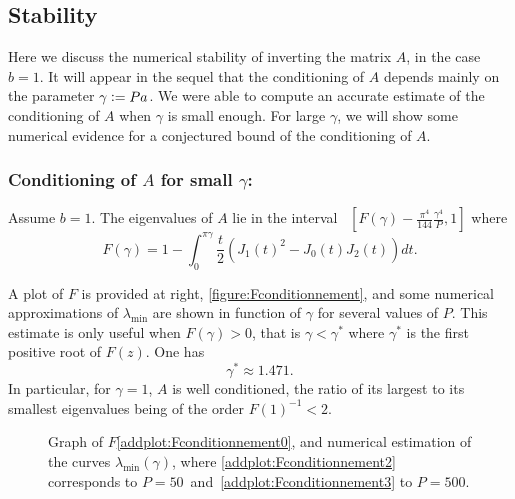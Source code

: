 \documentclass[11pt,a4paper]{article}
\begin{document}
\subsection{Stability}
\newcommand{\Pa}{\gamma}
\newcommand{\Pastar}{\Pa^*}
Here we discuss the numerical stability of inverting the matrix $A$, in the case $b=1$. It will appear in the sequel that the conditioning of $A$ depends mainly on the parameter $\Pa \isdef Pa$. We were able to compute an accurate estimate of the conditioning of $A$ when $\Pa$ is small enough. For large $\Pa$, we will show some numerical evidence for a conjectured bound of the conditioning of $A$.   
\vspace{0.3cm}
\noindent \begin{minipage}{0.5\textwidth}
\subsubsection*{Conditioning of $A$ for small $\Pa$:}
\begin{The} Assume $b=1$. The eigenvalues of $A$ lie in the interval~ ${[F(\Pa) - \frac{\pi^4}{144}\frac{\gamma^4}{P},1]}$ where
	\[F(\Pa) = 1 - \int_{0}^{\pi \gamma} \frac{t}{2}(J_1(t)^2 - J_0(t)J_2(t) )dt.\]
	\label{The:lowBoundCon}
\end{The}
A plot of $F$ is provided at right, \autoref{figure:Fconditionnement}, and some numerical approximations of $\lambda_{\min}$ are shown in function of $\Pa$ for several values of $P$. 			
This estimate is only useful when ${F(\Pa) > 0}$, that is ${\Pa < \Pastar}$ where $\Pastar$ is the first positive root of $F(z)$. One has 
\[\Pastar \approx 1.471.\]
In particular, for $\gamma = 1$, $A$ is well conditioned, the ratio of its largest to its smallest eigenvalues being of the order $F(1)^{-1} < 2$. 
\end{minipage}%
%
\begin{minipage}{0.5\textwidth}
	\begin{figure}[H]
		\centering			
		
		\captionsetup{width=0.7\textwidth}
		\caption{Graph of $F$\ref{addplot:Fconditionnement0}, and numerical estimation of the curves $\lambda_{\min}(\Pa)$, where \ref{addplot:Fconditionnement2} corresponds to ${P=50}$~and~\ref{addplot:Fconditionnement3} to ${P=500}$. }
		\label{figure:Fconditionnement}
	\end{figure}
\end{minipage}
\end{document}
